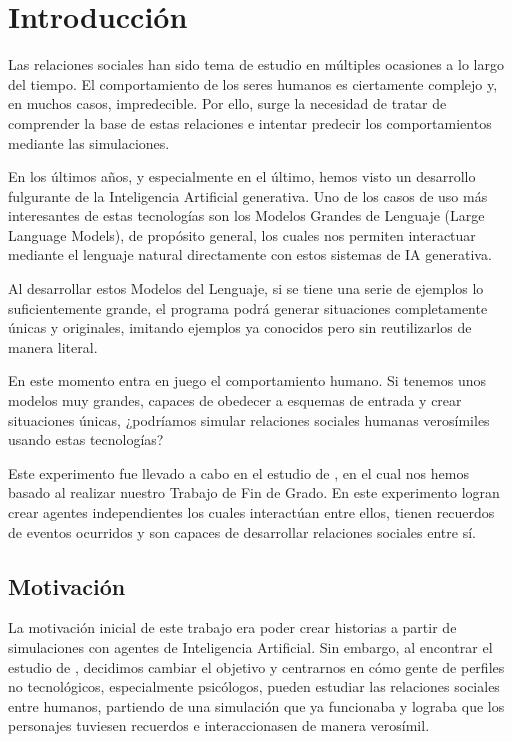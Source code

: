 \chapter{Introducción}
\label{cap:introduccion}


Las relaciones sociales han sido tema de estudio en múltiples ocasiones a lo largo del tiempo. El comportamiento de los seres humanos es ciertamente complejo y, en muchos casos, impredecible. Por ello, surge la necesidad de tratar de comprender la base de estas relaciones e intentar predecir los comportamientos mediante las simulaciones.

En los últimos años, y especialmente en el último, hemos visto un desarrollo fulgurante de la Inteligencia Artificial generativa. Uno de los casos de uso más interesantes de estas tecnologías son los Modelos Grandes de Lenguaje (Large Language Models), de propósito general, los cuales nos permiten interactuar mediante el lenguaje natural directamente con estos sistemas de IA generativa.

Al desarrollar estos Modelos del Lenguaje, si se tiene una serie de ejemplos lo suficientemente grande, el programa podrá generar situaciones completamente únicas y originales, imitando ejemplos ya conocidos pero sin reutilizarlos de manera literal.

En este momento entra en juego el comportamiento humano. Si tenemos unos modelos muy grandes, capaces de obedecer a esquemas de entrada y crear situaciones únicas, ¿podríamos simular relaciones sociales humanas verosímiles usando estas tecnologías?

Este experimento fue llevado a cabo en el estudio de \cite{park2023generative}, en el cual nos hemos basado al realizar nuestro Trabajo de Fin de Grado. En este experimento logran crear agentes independientes los cuales interactúan entre ellos, tienen recuerdos de eventos ocurridos y son capaces de desarrollar relaciones sociales entre sí.

\section{Motivación}
La motivación inicial de este trabajo era poder crear historias a partir de simulaciones con agentes de Inteligencia Artificial. Sin embargo, al encontrar el estudio de \ga \citep{park2023generative}, decidimos cambiar el objetivo y centrarnos en cómo gente de perfiles no tecnológicos, especialmente psicólogos, pueden estudiar las relaciones sociales entre humanos, partiendo de una simulación que ya funcionaba y lograba que los personajes tuviesen recuerdos e interaccionasen de manera verosímil.

